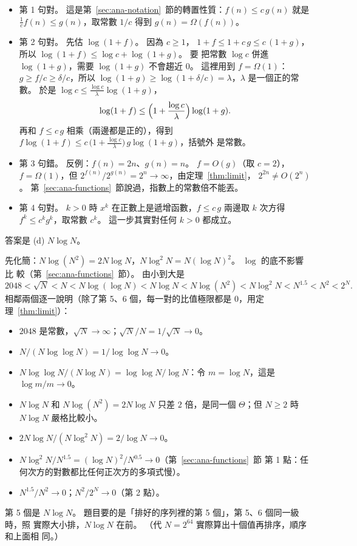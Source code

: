 \begin{itemize}
\item 第 1 句對。 這是第~\ref{sec:ana-notation}~節的轉置性質：$f(n) \le c\,g(n)$ 就是
$\frac{1}{c} f(n) \le g(n)$，取常數 $1/c$ 得到 $g(n) = \Omega(f(n))$。
\item 第 2 句對。 先估 $\log(1 + f)$。 因為 $c \ge 1$，
$1 + f \le 1 + c\,g \le c\,(1 + g)$，所以 $\log(1 + f) \le \log c + \log(1 + g)$。 要
把常數 $\log c$ 併進 $\log(1 + g)$，需要 $\log(1 + g)$ 不會趨近 $0$。 這裡用到
$f = \Omega(1)$：$g \ge f / c \ge \delta / c$，所以
$\log(1 + g) \ge \log(1 + \delta / c) = \lambda$，$\lambda$ 是一個正的常數。 於是
$\log c \le \frac{\log c}{\lambda} \log(1 + g)$，
\[
\log(1 + f) \le \Bigl(1 + \frac{\log c}{\lambda}\Bigr) \log(1 + g).
\]
再和 $f \le c\,g$ 相乘（兩邊都是正的），得到
$f \log(1 + f) \le c\,\bigl(1 + \frac{\log c}{\lambda}\bigr)\, g \log(1 + g)$，括號外
是常數。
\item 第 3 句錯。 反例：$f(n) = 2n$、$g(n) = n$。 $f = O(g)$（取 $c = 2$），
$f = \Omega(1)$，但 $2^{f(n)} / 2^{g(n)} = 2^{n} \to \infty$，由定理~\ref{thm:limit}，
$2^{2n} \ne O(2^n)$。 第~\ref{sec:ana-functions}~節說過，指數上的常數倍不能丟。
\item 第 4 句對。 $k > 0$ 時 $x^k$ 在正數上是遞增函數，$f \le c\,g$ 兩邊取 $k$ 次方得
$f^k \le c^k g^k$，取常數 $c^k$。 這一步其實對任何 $k > 0$ 都成立。
\end{itemize}

答案是 (d) $N \log N$。

先化簡：$N \log(N^2) = 2N \log N$，$N \log^2 N = N (\log N)^2$。 $\log$ 的底不影響比
較（第~\ref{sec:ana-functions}~節）。 由小到大是
\[
2048 < \sqrt{N} < N < N \log(\log N) < N \log N < N \log(N^2) < N \log^2 N < N^{1.5}
< N^2 < 2^N .
\]
相鄰兩個逐一說明（除了第 5、6 個，每一對的比值極限都是 $0$，用定理~\ref{thm:limit}）：
\begin{itemize}
\item $2048$ 是常數，$\sqrt{N} \to \infty$；$\sqrt{N} / N = 1/\sqrt{N} \to 0$。
\item $N / (N \log\log N) = 1 / \log\log N \to 0$。
\item $N \log\log N / (N \log N) = \log\log N / \log N$：令 $m = \log N$，這是
$\log m / m \to 0$。
\item $N \log N$ 和 $N \log(N^2) = 2N \log N$ 只差 $2$ 倍，是同一個 $\Theta$；但
$N \ge 2$ 時 $N \log N$ 嚴格比較小。
\item $2N \log N / (N \log^2 N) = 2 / \log N \to 0$。
\item $N \log^2 N / N^{1.5} = (\log N)^2 / N^{0.5} \to 0$（第~\ref{sec:ana-functions}~節
第 1 點：任何次方的對數都比任何正次方的多項式慢）。
\item $N^{1.5} / N^2 \to 0$；$N^2 / 2^N \to 0$（第 2 點）。
\end{itemize}
第 5 個是 $N \log N$。 題目要的是「排好的序列裡的第 5 個」，第 5、6 個同一級時，照
實際大小排，$N \log N$ 在前。 （代 $N = 2^{64}$ 實際算出十個值再排序，順序和上面相
同。）

